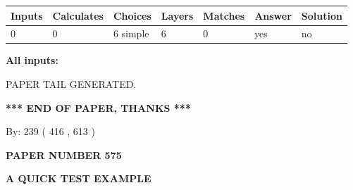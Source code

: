 \documentclass[12pt]{article}
\begin{document}
 
\noindent{}
 
 
   
   
   
   
\noindent\begin{tabular}{|l|l|l|l|l|l|l|}
 \hline
Inputs & Calculates & Choices & Layers & Matches & Answer & Solution \\ \hline
 0  & 
 0  & 
 6
  simple  
  & 
 6  & 
 0  & 
  yes & 
  no 
  \\ \hline
 \end{tabular}
   
   
   
   
\noindent{}
   
   
   
   
\noindent\vspace{0.1in}\hspace{-0.08in} {\textbf{\Large{All inputs: }}}
   
   
   
   
   
   
 \vspace{0.2in}
 
   
   
\vspace{2.0in} PAPER TAIL GENERATED.
   
   
   
   
\vspace{1.0in} 
{\textbf{\large{ *** END OF PAPER, THANKS *** }}} 
   
   
\hspace{1.0in} By: 
 239 ( 416 ,  613 )
   
   
   
   
\newpage 
\setcounter{page}{ 
   575001 } 
   
   
   
   
 {\textbf{ \Large{ PAPER NUMBER  575  }}}
   
   
\vspace{0.2in}
   
   
   
   
   
   
   
   
 \vspace{0.2in}
{\LARGE {\textbf{ A QUICK TEST EXAMPLE}}}
   
\end{document}
